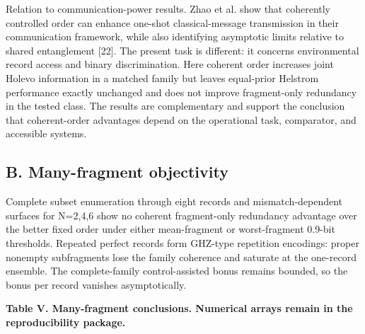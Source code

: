 \documentclass[
]{article}
\begin{document}
Relation to communication-power results. Zhao et al. show that
coherently controlled order can enhance one-shot classical-message
transmission in their communication framework, while also identifying
asymptotic limits relative to shared entanglement {[}22{]}. The present
task is different: it concerns environmental record access and binary
discrimination. Here coherent order increases joint Holevo information
in a matched family but leaves equal-prior Helstrom performance exactly
unchanged and does not improve fragment-only redundancy in the tested
class. The results are complementary and support the conclusion that
coherent-order advantages depend on the operational task, comparator,
and accessible systems.

\subsection{B. Many-fragment
objectivity}\label{b.-many-fragment-objectivity}

Complete subset enumeration through eight records and mismatch-dependent
surfaces for N=2,4,6 show no coherent fragment-only redundancy advantage
over the better fixed order under either mean-fragment or worst-fragment
0.9-bit thresholds. Repeated perfect records form GHZ-type repetition
encodings: proper nonempty subfragments lose the family coherence and
saturate at the one-record ensemble. The complete-family
control-assisted bonus remains bounded, so the bonus per record vanishes
asymptotically.

\textbf{Table V. Many-fragment conclusions. Numerical arrays remain in
the reproducibility package.}
\end{document}
